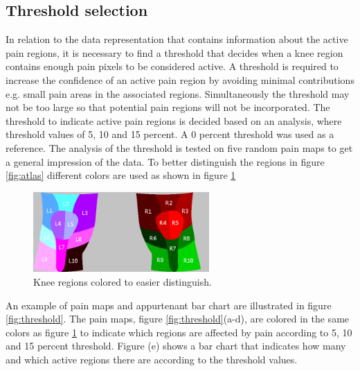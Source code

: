 \subsection{Threshold selection}\label{sec:Selectthreshold}
In relation to the data representation that contains information about the active pain regions, it is necessary to find a threshold that decides when a knee region contains enough pain pixels to be considered active. A threshold is required to increase the confidence of an active pain region by avoiding minimal contributions e.g. small pain areas in the associated regions. Simultaneously the threshold may not be too large so that potential pain regions will not be incorporated. The threshold to indicate active pain regions is decided based on an analysis, where threshold values of 5, 10 and 15 percent. A 0 percent threshold was used as a reference. 
The analysis of the threshold is tested on five random pain maps to get a general impression of the data. To better distinguish the regions in figure \ref{fig:atlas} different colors are used as shown in figure \ref{fig:colorregion}


\begin{figure} [H]
\centering
\includegraphics[width=0.6\textwidth]{figures/colorregion}
\caption{Knee regions colored to easier distinguish.}
\label{fig:colorregion}
\end{figure}

\noindent
An example of pain maps and appurtenant bar chart are illustrated in figure \ref{fig:threshold}. The pain maps, figure \ref{fig:threshold}(a-d), are colored in the same colors as figure \ref{fig:colorregion} to indicate which regions are affected by pain according to 5, 10 and 15 percent threshold. Figure (e) shows a bar chart that indicates how many and which active regions there are according to the threshold values.

